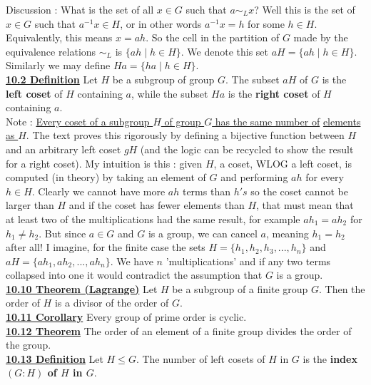 \documentclass[12pt, letterpaper]{article}
\begin{document}
Discussion : What is the set of all $x \in G$ such that $a \sim_L x$? Well this is the set of $x \in G$ such that $a^{-1}x \in H$, or in other words $a^{-1}x = h$ for some $h \in H$. Equivalently, this means $x = ah$. So the cell in the partition of $G$ made by the equivalence relations $\sim_L$ is $\{ah \; | \; h \in H\}$. We denote this set $aH = \{ah \; | \; h \in H\}$. Similarly we may define $Ha = \{ha \; | \; h \in H\}$. \\

\noindent \underline{\bf 10.2 Definition} Let $H$ be a subgroup of group $G$. The subset $aH$ of $G$ is the {\bf left coset} of $H$ containing $a$, while the subset $Ha$ is the {\bf right coset} of $H$ containing $a$. \\

Note : \underline{Every coset of a subgroup $H$ of group $G$ has the same number of} \underline{elements as $H$}. The text proves this rigorously by defining a bijective function between $H$ and an arbitrary left coset $gH$ (and the logic can be recycled to show the result for a right coset). My intuition is this : given $H$, a coset, WLOG a left coset, is computed (in theory) by taking an element of $G$ and performing $ah$ for every $h \in H$. Clearly we cannot have more $ah$ terms than $h's$ so the coset cannot be larger than $H$ and if the coset has fewer elements than $H$, that must mean that at least two of the multiplications had the same result, for example $ah_1 = ah_2$ for $h_1 \neq h_2$. But since $a \in G$ and $G$ is a group, we can cancel $a$, meaning $h_1 = h_2$ after all! I imagine, for the finite case the sets $H = \{h_1,h_2,h_3,...,h_n\}$ and $aH = \{ah_1, ah_2,...,ah_n\}$. We have $n$ 'multiplications' and if any two terms collapsed into one it would contradict the assumption that $G$ is a group.\\

\noindent \underline{\bf 10.10 Theorem (Lagrange)} Let $H$ be a subgroup of a finite group $G$. Then the order of $H$ is a divisor of the order of $G$. \\

\noindent \underline{\bf 10.11 Corollary} Every group of prime order is cyclic. \\

\noindent \underline{\bf 10.12 Theorem} The order of an element of a finite group divides the order of the group.\\

\noindent \underline{\bf 10.13 Definition} Let $H \leq G$. The number of left cosets of $H$ in $G$ is the {\bf index $(G:H)$ of $H$ in $G$}. \\
\end{document}
